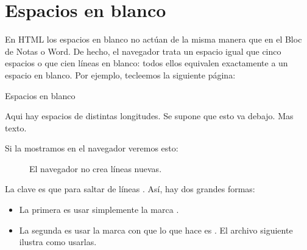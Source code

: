 \documentclass[a4paper,12pt,spanish]{sphinxmanual}
\begin{document}
\chapter{Espacios en blanco}
\label{\detokenize{index:espacios-en-blanco}}
En HTML los espacios en blanco no actúan de la misma manera que en el Bloc de Notas o Word. De hecho, el navegador trata un espacio igual que cinco espacios o que cien líneas en blanco: todos ellos equivalen exactamente a un espacio en blanco. Por ejemplo, tecleemos la siguiente página:

%
\begin{sphinxVerbatim}[commandchars=\\\{\}]

    Espacios en blanco

    Aqui hay espacios de distintas longitudes.
    Se supone que esto va debajo.
    Mas texto.

\end{sphinxVerbatim}

Si la mostramos en el navegador veremos esto:

\begin{figure}[htbp]
\centering
\capstart

\noindent{}
\caption{El navegador no crea líneas nuevas.}\label{\detokenize{index:id16}}\end{figure}

La clave es que para saltar de líneas . Así, hay dos grandes formas:
\begin{itemize}
\item {} 
La primera es usar simplemente la marca .

\item {} 
La segunda es usar la marca  con  que lo que hace es . El archivo siguiente ilustra como usarlas.

\end{itemize}
\end{document}
